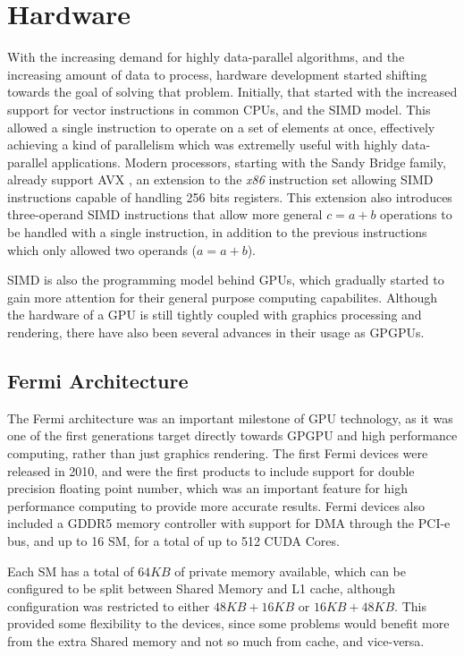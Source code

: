 \documentclass[main.tex]{subfiles}
\begin{document}
\section{Hardware}

With the increasing demand for highly data-parallel algorithms, and the increasing amount of data to process, hardware development started shifting towards the goal of solving that problem. Initially, that started with the increased support for vector instructions in common \acsp{CPU}, and the \acs{SIMD} model. This allowed a single instruction to operate on a set of elements at once, effectively achieving a kind of parallelism which was extremelly useful with highly data-parallel applications. Modern \intel processors, starting with the Sandy Bridge family, already support \ac{AVX} , an extension to the \textit{x86} instruction set allowing \acs{SIMD} instructions capable of handling 256 bits registers. This extension also introduces three-operand \acs{SIMD} instructions that allow more general $c = a + b$ operations to be handled with a single instruction, in addition to the previous instructions which only allowed two operands ($a = a + b$).

\acs{SIMD} is also the programming model behind \acsp{GPU}, which gradually started to gain more attention for their general purpose computing capabilites. Although the hardware of a \acs{GPU} is still tightly coupled with graphics processing and rendering, there have also been several advances in their usage as \acp{GPGPU}.


\subsection{\nvidia Fermi Architecture}

The Fermi architecture was an important milestone of \acs{GPU} technology, as it was one of the first generations target directly towards \acs{GPGPU} and high performance computing, rather than just graphics rendering. The first Fermi devices were released in 2010, and were the first \nvidia products to include support for double precision floating point number, which was an important feature for high performance computing to provide more accurate results. Fermi devices also included a GDDR5 memory controller with support for \ac{DMA} through the \acs{PCI-e} bus, and up to 16 \acf{SM}, for a total of up to 512 \acs{CUDA} Cores.

Each \ac{SM} has a total of $64KB$ of private memory available, which can be configured to be split between Shared Memory and L1 cache, although configuration was restricted to either $48KB + 16KB$ or $16KB + 48KB$. This provided some flexibility to the devices, since some problems would benefit more from the extra Shared memory and not so much from cache, and vice-versa.
\end{document}
